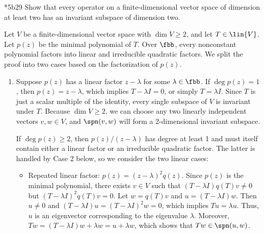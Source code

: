 \begin{exercise}*{5b29}
    Show that every operator on a finite-dimensional vector space of dimension at least two has an invariant subspace of dimension two.

\end{exercise}

\begin{sol}
    Let $V$ be a finite-dimensional vector space with $\dim V \geq 2$, and let $T \in \lin{V}$.
    Let $p(z)$ be the minimal polynomial of $T$.
    Over $\fbb$, every nonconstant polynomial factors into linear and irreducible quadratic factors.
    We split the proof into two cases based on the factorization of $p(z)$.
    \begin{enumerate}
        \item Suppose $p(z)$ has a linear factor $z - \lambda$ for some $\lambda \in \fbb$. 
        If $\deg p(z) = 1$, then $p(z) = z - \lambda$, which implies $T - \lambda I = 0$, or simply $T = \lambda I$. Since $T$ is just a scalar multiple of the identity, every single subspace of $V$ is invariant under $T$. Because $\dim V \geq 2$, we can choose any two linearly independent vectors $v, w \in V$, and $\spn(v, w)$ will form a 2-dimensional invariant subspace.

        If $\deg p(z) \geq 2$, then $p(z)/(z - \lambda)$ has degree at least 1 and must itself contain either a linear factor or an irreducible quadratic factor. The latter is handled by Case 2 below, so we consider the two linear cases:
        \begin{itemize}
            \item Repeated linear factor: $p(z) = (z - \lambda)^2 q(z)$.
            Since $p(z)$ is the minimal polynomial, there exists $v \in V$ such that $(T - \lambda I)q(T)v \neq 0$ but $(T - \lambda I)^2 q(T)v = 0$.
            Let $w = q(T)v$ and $u = (T - \lambda I)w$. 
            Then $u \neq 0$ and $(T - \lambda I)u = (T - \lambda I)^2 w = 0$, which implies $Tu = \lambda u$. 
            Thus, $u$ is an eigenvector corresponding to the eigenvalue $\lambda$. Moreover, $Tw = (T - \lambda I)w + \lambda w = u + \lambda w$, which shows that $Tw \in \spn(u, w)$. 
            

\end{itemize}
\end{enumerate}
\end{sol}
